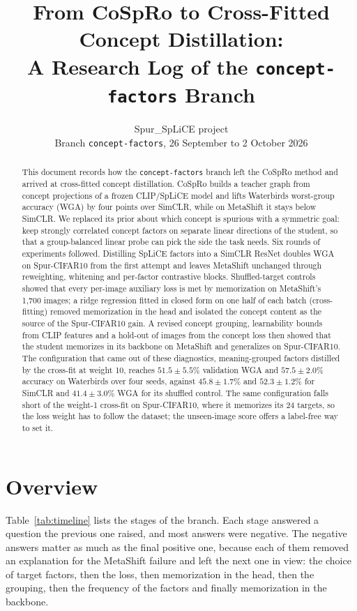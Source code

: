 \documentclass{article}
\title{From CoSpRo to Cross-Fitted Concept Distillation:\\
A Research Log of the \texttt{concept-factors} Branch}
\author{Spur\_SpLiCE project\\
Branch \texttt{concept-factors}, 26 September to 2 October 2026}
\begin{document}
\maketitle

\begin{abstract}
This document records how the \texttt{concept-factors} branch left the CoSpRo method and arrived at
cross-fitted concept distillation. CoSpRo builds a teacher graph from concept projections of a frozen
CLIP/SpLiCE model and lifts Waterbirds worst-group accuracy (WGA) by four points over SimCLR, while on
MetaShift it stays below SimCLR. We replaced its prior about which concept is spurious with a
symmetric goal: keep strongly correlated concept factors on separate linear directions of the student,
so that a group-balanced linear probe can pick the side the task needs. Six rounds of experiments
followed. Distilling SpLiCE factors into a SimCLR ResNet doubles WGA on Spur-CIFAR10 from the first
attempt and leaves MetaShift unchanged through reweighting, whitening and per-factor contrastive
blocks. Shuffled-target controls showed that every per-image auxiliary loss is met by memorization on
MetaShift's 1,700 images; a ridge regression fitted in closed form on one half of each batch
(cross-fitting) removed memorization in the head and isolated the concept content as the source of the
Spur-CIFAR10 gain. A revised concept grouping, learnability bounds from CLIP features and a hold-out of
images from the concept loss then showed that the student memorizes in its backbone on MetaShift and
generalizes on Spur-CIFAR10. The configuration that came out of these diagnostics, meaning-grouped
factors distilled by the cross-fit at weight 10, reaches $51.5\pm5.5$\% validation WGA and
$57.5\pm2.0$\% accuracy on Waterbirds over four seeds, against $45.8\pm1.7$\% and $52.3\pm1.2$\% for
SimCLR and $41.4\pm3.0$\% WGA for its shuffled control. The same configuration falls short of the
weight-1 cross-fit on Spur-CIFAR10, where it memorizes its 24 targets, so the loss weight has to follow
the dataset; the unseen-image score offers a label-free way to set it.
\end{abstract}

\section{Overview}
\label{sec:overview}

Table~\ref{tab:timeline} lists the stages of the branch. Each stage answered a question the previous
one raised, and most answers were negative. The negative answers matter as much as the final positive
one, because each of them removed an explanation for the MetaShift failure and left the next one in
view: the choice of target factors, then the loss, then memorization in the head, then the grouping,
then the frequency of the factors and finally memorization in the backbone.
\end{document}
